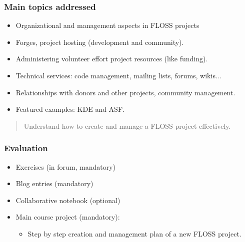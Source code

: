 
\begin{frame}
\frametitle{Main topics addressed}

\begin{itemize}
\item Organizational and management aspects in FLOSS projects
\item Forges, project hosting (development and community).
\item Administering volunteer effort project resources (like funding).
\item Technical services: code management, mailing lists, forums, wikis...
\item Relationships with donors and other projects, community management.
\item Featured examples: KDE and ASF.
\end{itemize}

\begin{quote}
\begin{center}
Understand how to create and manage a FLOSS project effectively.
\end{center}
\end{quote}

\end{frame}


\begin{frame}
\frametitle{Evaluation}

\begin{itemize}
\item Exercises (in forum, mandatory)
\item Blog entries (mandatory)
\item Collaborative notebook (optional)
\item Main course project (mandatory):
\begin{itemize}
 \item Step by step creation and management plan of a new FLOSS project.
\end{itemize}

\end{itemize}

\end{frame}


